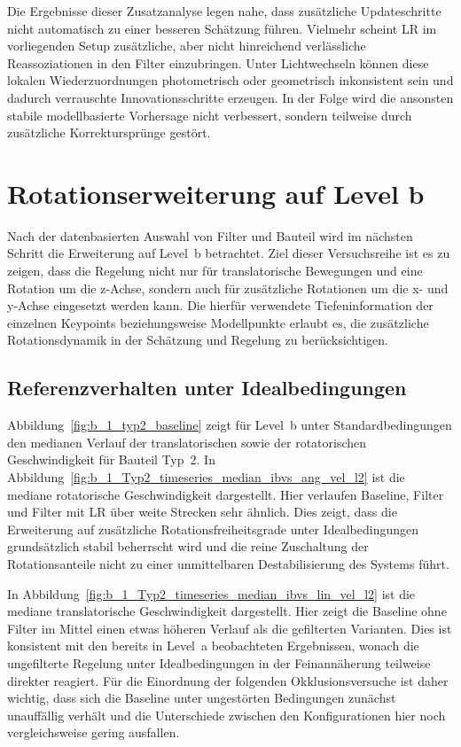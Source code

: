 Die Ergebnisse dieser Zusatzanalyse legen nahe, dass zusätzliche Updateschritte nicht automatisch zu einer besseren Schätzung führen. Vielmehr scheint \ac{LR} im vorliegenden Setup zusätzliche, aber nicht hinreichend verlässliche Reassoziationen in den Filter einzubringen. Unter Lichtwechseln können diese lokalen Wiederzuordnungen photometrisch oder geometrisch inkonsistent sein und dadurch verrauschte Innovationsschritte erzeugen. In der Folge wird die ansonsten stabile modellbasierte Vorhersage nicht verbessert, sondern teilweise durch zusätzliche Korrektursprünge gestört.

\section{Rotationserweiterung auf Level b}
\label{sec:rotation_level_b}

Nach der datenbasierten Auswahl von Filter und Bauteil wird im nächsten Schritt die Erweiterung auf Level~b betrachtet. Ziel dieser Versuchsreihe ist es zu zeigen, dass die Regelung nicht nur für translatorische Bewegungen und eine Rotation um die z-Achse, sondern auch für zusätzliche Rotationen um die x- und y-Achse eingesetzt werden kann. Die hierfür verwendete Tiefeninformation der einzelnen Keypoints beziehungsweise Modellpunkte erlaubt es, die zusätzliche Rotationsdynamik in der Schätzung und Regelung zu berücksichtigen.

\subsection{Referenzverhalten unter Idealbedingungen}

Abbildung~\ref{fig:b_1_typ2_baseline} zeigt für Level~b unter Standardbedingungen den medianen Verlauf der translatorischen sowie der rotatorischen Geschwindigkeit für Bauteil Typ~2. In Abbildung~\ref{fig:b_1_Typ2_timeseries_median_ibvs_ang_vel_l2} ist die mediane rotatorische Geschwindigkeit dargestellt. Hier verlaufen Baseline, Filter und Filter mit \ac{LR} über weite Strecken sehr ähnlich. Dies zeigt, dass die Erweiterung auf zusätzliche Rotationsfreiheitsgrade unter Idealbedingungen grundsätzlich stabil beherrscht wird und die reine Zuschaltung der Rotationsanteile nicht zu einer unmittelbaren Destabilisierung des Systems führt.

In Abbildung~\ref{fig:b_1_Typ2_timeseries_median_ibvs_lin_vel_l2} ist die mediane translatorische Geschwindigkeit dargestellt. Hier zeigt die Baseline ohne Filter im Mittel einen etwas höheren Verlauf als die gefilterten Varianten. Dies ist konsistent mit den bereits in Level~a beobachteten Ergebnissen, wonach die ungefilterte Regelung unter Idealbedingungen in der Feinannäherung teilweise direkter reagiert. Für die Einordnung der folgenden Okklusionsversuche ist daher wichtig, dass sich die Baseline unter ungestörten Bedingungen zunächst unauffällig verhält und die Unterschiede zwischen den Konfigurationen hier noch vergleichsweise gering ausfallen.

